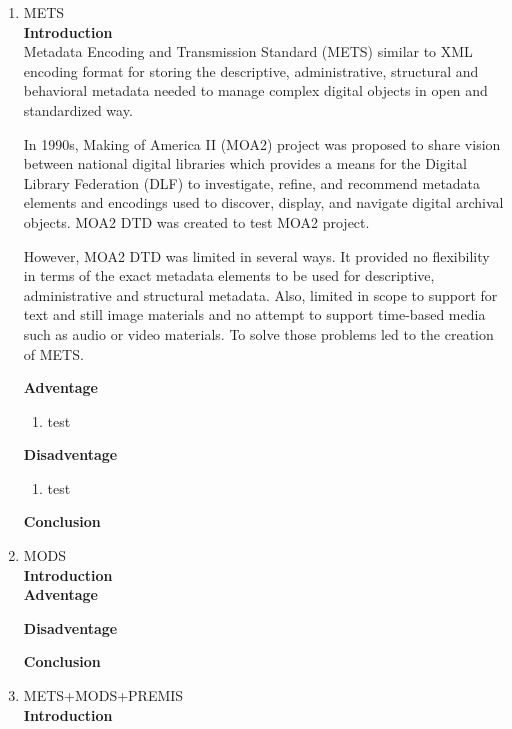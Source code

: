 \documentclass[a4paper]{article} %
\begin{document}
\begin{enumerate}
	\item METS\\
	{\bf Introduction}\\
	Metadata Encoding and Transmission Standard (METS) similar to XML encoding format for storing the descriptive, administrative, structural and behavioral metadata needed to manage complex digital objects in open and standardized way.
	
	In 1990s, Making of America II (MOA2) project was proposed to share vision between national digital libraries which provides a means for the Digital Library Federation (DLF) to investigate, refine, and recommend metadata elements and encodings used to discover, display, and navigate digital archival objects. MOA2 DTD was created to test MOA2 project.
	
	However, MOA2 DTD was limited in several ways. It provided no flexibility in terms of the exact metadata elements to be used for descriptive, administrative and structural metadata. Also, limited in scope to support for text and still image materials and no attempt to support time-based media such as audio or video materials. To solve those problems led to the creation of METS.
	
	{\bf Adventage}
	\begin{enumerate}
		\item test
	\end{enumerate}	
	{\bf Disadventage}
	\begin{enumerate}
		\item test
	\end{enumerate}
	{\bf Conclusion}\\	
	
	\item MODS\\
	{\bf Introduction}\\
	
	{\bf Adventage}
	\begin{enumerate}
		
	\end{enumerate}	
	{\bf Disadventage}
	\begin{enumerate}
		
	\end{enumerate}
	{\bf Conclusion}\\
	
	\item METS+MODS+PREMIS\\
	{\bf Introduction}\\
	

\end{enumerate}
\end{document}
